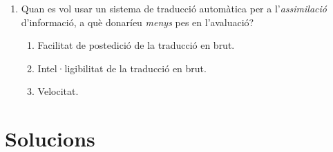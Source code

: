 \begin{enumerate}
\item Quan es vol usar un sistema de traducció automàtica per a
  l'\emph{assimilació} d'informació, a què donaríeu \emph{menys} pes
  en l'avaluació?
   
\begin{enumerate}
\item Facilitat de postedició de la traducció en brut.
\item Intel·ligibilitat de la traducció en brut.
\item Velocitat.
\end{enumerate}



\end{enumerate}

\section{Solucions}
